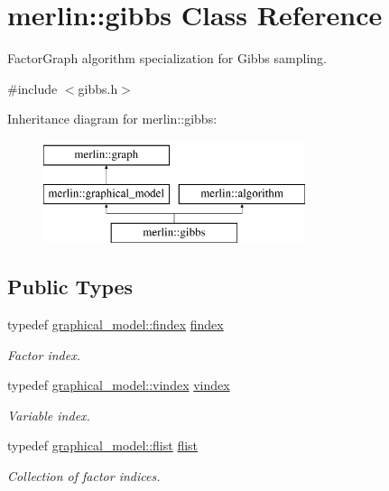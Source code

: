 \hypertarget{classmerlin_1_1gibbs}{}\section{merlin\+:\+:gibbs Class Reference}
\label{classmerlin_1_1gibbs}


Factor\+Graph algorithm specialization for Gibbs sampling.  




{\ttfamily \#include $<$gibbs.\+h$>$}

Inheritance diagram for merlin\+:\+:gibbs\+:\begin{figure}[H]
\begin{center}
\leavevmode
\includegraphics[height=3.000000cm]{classmerlin_1_1gibbs}
\end{center}
\end{figure}
\subsection*{Public Types}
\begin{DoxyCompactItemize}
\item 
\hypertarget{classmerlin_1_1gibbs_a19c11865cd36a9920aec11f902958b93}{}typedef \hyperlink{classmerlin_1_1graphical__model_ab2b46f09d8142bb68f243ecadbdabb6b}{graphical\+\_\+model\+::findex} \hyperlink{classmerlin_1_1gibbs_a19c11865cd36a9920aec11f902958b93}{findex}\label{classmerlin_1_1gibbs_a19c11865cd36a9920aec11f902958b93}

\begin{DoxyCompactList}\small\item\em Factor index. \end{DoxyCompactList}\item 
\hypertarget{classmerlin_1_1gibbs_a6bfd73700f9e6917f89ea5c7894c7a5d}{}typedef \hyperlink{classmerlin_1_1graphical__model_a275006a490bc09239c12a4d93d53b135}{graphical\+\_\+model\+::vindex} \hyperlink{classmerlin_1_1gibbs_a6bfd73700f9e6917f89ea5c7894c7a5d}{vindex}\label{classmerlin_1_1gibbs_a6bfd73700f9e6917f89ea5c7894c7a5d}

\begin{DoxyCompactList}\small\item\em Variable index. \end{DoxyCompactList}\item 
\hypertarget{classmerlin_1_1gibbs_ae98b71f43cbaadae19535d4728225c06}{}typedef \hyperlink{classmerlin_1_1graphical__model_a615e25ec6594615fddfd4c3c4776b99f}{graphical\+\_\+model\+::flist} \hyperlink{classmerlin_1_1gibbs_ae98b71f43cbaadae19535d4728225c06}{flist}\label{classmerlin_1_1gibbs_ae98b71f43cbaadae19535d4728225c06}

\begin{DoxyCompactList}\small\item\em Collection of factor indices. \end{DoxyCompactList}\end{DoxyCompactItemize}
